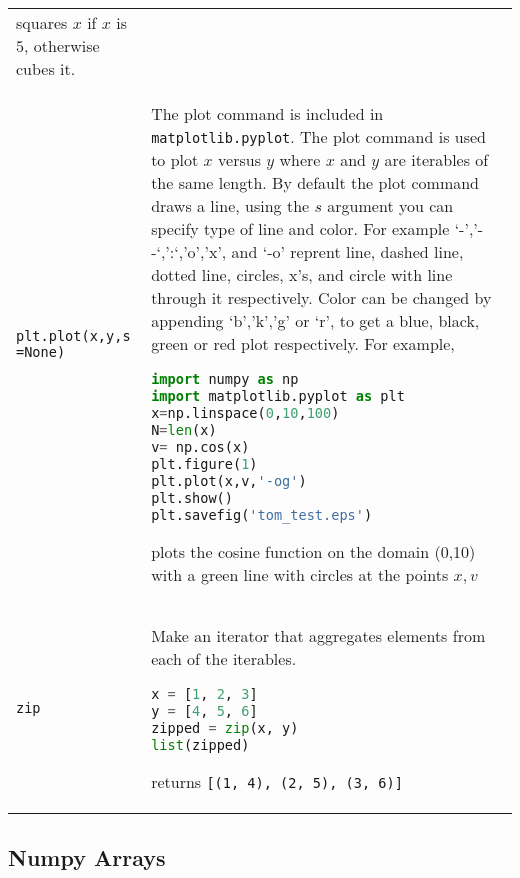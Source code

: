 \documentclass[]{article}
\begin{document}
\begin{longtable}[]{@{}ll@{}}
\begin{minipage}[t]{0.77\columnwidth}
squares \(x\) if \(x\) is \(5\), otherwise cubes it.\strut
\end{minipage}\tabularnewline
\begin{minipage}[t]{0.17\columnwidth}\raggedright\strut
\lstinline!plt.plot(x,y,s =None)!\strut
\end{minipage} & \begin{minipage}[t]{0.77\columnwidth}\raggedright\strut
The plot command is included in \lstinline!matplotlib.pyplot!. The plot
command is used to plot \(x\) versus \(y\) where \(x\) and \(y\) are
iterables of the same length. By default the plot command draws a line,
using the \(s\) argument you can specify type of line and color. For
example `-','- -`,':`,'o','x', and `-o' reprent line, dashed line,
dotted line, circles, x's, and circle with line through it respectively.
Color can be changed by appending `b','k','g' or `r', to get a blue,
black, green or red plot respectively. For example,

\begin{lstlisting}[language=Python]
import numpy as np
import matplotlib.pyplot as plt
x=np.linspace(0,10,100)
N=len(x)
v= np.cos(x)
plt.figure(1)
plt.plot(x,v,'-og')
plt.show()
plt.savefig('tom_test.eps')
\end{lstlisting}

plots the cosine function on the domain (0,10) with a green line with
circles at the points \(x,v\)\strut
\end{minipage}\tabularnewline
\begin{minipage}[t]{0.17\columnwidth}\raggedright\strut
\lstinline!zip!\strut
\end{minipage} & \begin{minipage}[t]{0.77\columnwidth}\raggedright\strut
Make an iterator that aggregates elements from each of the iterables.

\begin{lstlisting}[language=Python]
x = [1, 2, 3]
y = [4, 5, 6]
zipped = zip(x, y)
list(zipped)
\end{lstlisting}

returns \lstinline![(1, 4), (2, 5), (3, 6)]!\strut
\end{minipage}\tabularnewline
\bottomrule
\end{longtable}

\subsection{Numpy Arrays}\label{numpy-arrays}
\end{document}
